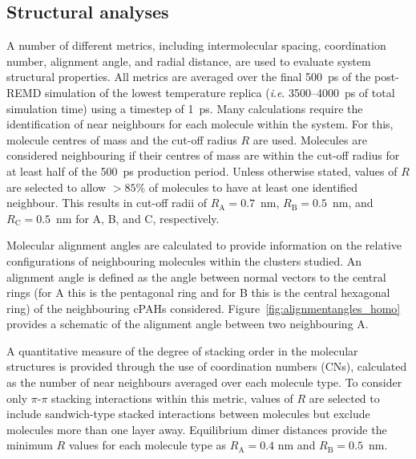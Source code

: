 \subsection{Structural analyses}
A number of different metrics, including intermolecular spacing, coordination number, alignment angle, and radial distance, are used to evaluate system structural properties. All metrics are averaged over the final 500~ps of the post-REMD simulation of the lowest temperature replica (\textit{i}.\textit{e}. 3500--4000~ps of total simulation time) using a timestep of 1~ps. 
Many calculations require the identification of near neighbours for each molecule within the system. For this, molecule centres of mass and the cut-off radius $R$ are used. Molecules are considered neighbouring if their centres of mass are within the cut-off radius for at least half of the 500~ps production period. Unless otherwise stated, values of $R$ are selected to allow $>85\%$ of molecules to have at least one identified neighbour. This results in cut-off radii of $R_{\text{A}} = 0.7$~nm, $R_{\text{B}} = 0.5$~nm, and $R_{\text{C}} = 0.5$~nm for A, B, and C, respectively. 


Molecular alignment angles are calculated to provide information on the relative configurations of neighbouring molecules within the clusters studied. An alignment angle is defined as the angle between normal vectors to the central rings (for A this is the pentagonal ring and for B this is the central hexagonal ring) of the neighbouring cPAHs considered.  Figure~\ref{fig:alignmentangles_homo} provides a schematic of the alignment angle between two neighbouring A.

A quantitative measure of the degree of stacking order in the molecular structures is provided through the use of coordination numbers (CNs), calculated as the number of near neighbours averaged over each molecule type. To consider only $\pi$-$\pi$ stacking interactions within this metric, values of $R$ are selected to include sandwich-type stacked interactions between molecules but exclude molecules more than one layer away. Equilibrium dimer distances provide the minimum $R$ values for each molecule type as $R_{\text{A}} = 0.4$ nm and $R_{\text{B}} = 0.5$~nm.

